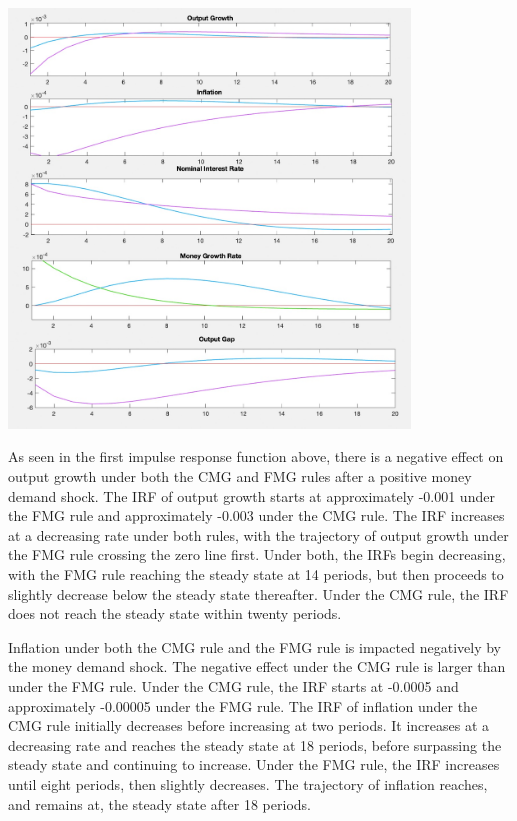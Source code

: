 \documentclass[11pt,preprint, authoryear]{elsarticle}
\let\origfigure\figure
\let\endorigfigure\endfigure
\renewenvironment{figure}[1][2] {
    \expandafter\origfigure\expandafter[H]
} {
    \endorigfigure
}
\numberwithin{equation}{section}
\numberwithin{figure}{section}
\numberwithin{table}{section}
\begin{document}
\begin{figure}
\centering
\includegraphics[width=0.8\textwidth,height=0.6\textheight]{./figures/money-demand-shock.jpeg}
\caption{Plots of Impulse Response Functions for a Money Demand Shock}
\end{figure}

As seen in the first impulse response function above, there is a
negative effect on output growth under both the CMG and FMG rules after
a positive money demand shock. The IRF of output growth starts at
approximately -0.001 under the FMG rule and approximately -0.003 under
the CMG rule. The IRF increases at a decreasing rate under both rules,
with the trajectory of output growth under the FMG rule crossing the
zero line first. Under both, the IRFs begin decreasing, with the FMG
rule reaching the steady state at 14 periods, but then proceeds to
slightly decrease below the steady state thereafter. Under the CMG rule,
the IRF does not reach the steady state within twenty periods.

Inflation under both the CMG rule and the FMG rule is impacted
negatively by the money demand shock. The negative effect under the CMG
rule is larger than under the FMG rule. Under the CMG rule, the IRF
starts at -0.0005 and approximately -0.00005 under the FMG rule. The IRF
of inflation under the CMG rule initially decreases before increasing at
two periods. It increases at a decreasing rate and reaches the steady
state at 18 periods, before surpassing the steady state and continuing
to increase. Under the FMG rule, the IRF increases until eight periods,
then slightly decreases. The trajectory of inflation reaches, and
remains at, the steady state after 18 periods.
\end{document}
